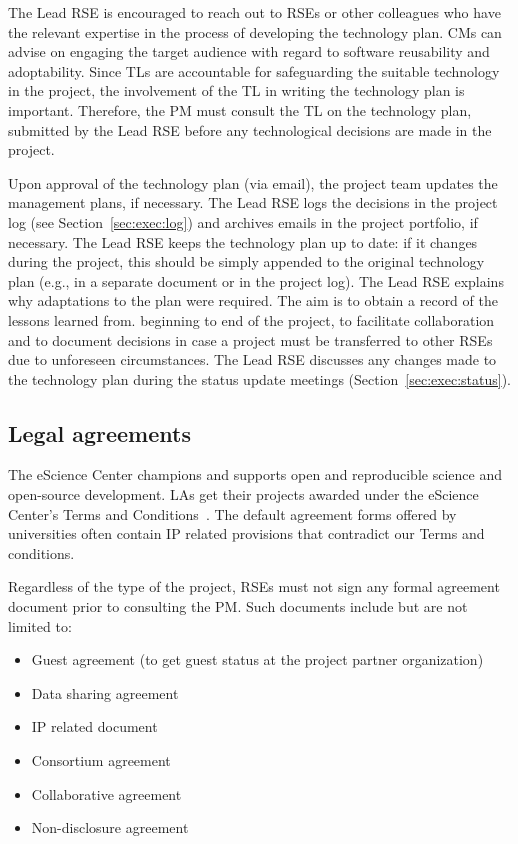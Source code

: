 The Lead RSE is encouraged to reach out to RSEs or other colleagues who have the relevant expertise in the process of
developing the technology plan. CMs can advise on engaging the target audience with regard to software reusability and
adoptability. Since TLs are accountable for safeguarding the suitable technology in the project, the involvement of the
TL in writing the technology plan is important. Therefore, the PM must consult the TL on the technology plan, submitted
by the Lead RSE before any technological decisions are made in the project.

Upon approval of the technology plan (via email), the project team updates the management plans, if necessary. The Lead
RSE logs the decisions in the project log (see Section~\ref{sec:exec:log}) and archives emails in the project
portfolio, if necessary. The Lead RSE keeps the technology plan up to date: if it changes during the project, this
should be simply appended to the original technology plan (e.g., in a separate document or in the project log). The
Lead RSE explains why adaptations to the plan were required. The aim is to obtain a record of the lessons learned from.
beginning to end of the project, to facilitate collaboration and to document decisions in case a project must be
transferred to other RSEs due to unforeseen circumstances. The Lead RSE discusses any changes made to the technology
plan during the status update meetings (Section~\ref{sec:exec:status}).

\subsection{Legal agreements}
\label{sec:init:legal}
The eScience Center champions and supports open and reproducible science and open-source development. LAs 
get their projects awarded under the eScience Center's Terms and Conditions~\cite{nlesc-terms}. The default agreement forms offered by universities often contain IP related provisions that contradict
our Terms and conditions.

Regardless of the type of the project, RSEs must not sign any formal agreement document prior to consulting the PM. Such
documents include but are not limited to:
\begin{itemize}
\item Guest agreement (to get guest status at the project partner organization)
\item Data sharing agreement
\item IP related document
\item Consortium agreement
\item Collaborative agreement
\item Non-disclosure agreement
\end{itemize}

